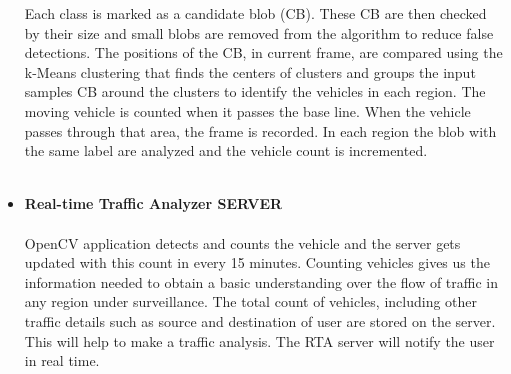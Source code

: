\begin{itemize}
Each class is marked as a candidate blob (CB). These CB are then checked by their size and small blobs are removed from the algorithm to reduce false detections. The positions of the CB, in current frame, are compared using the k-Means clustering that finds the centers of clusters and groups the input samples CB around the clusters to identify the vehicles in each region. The moving vehicle is counted when it passes the base line. When the vehicle passes through that area, the frame is recorded. In each region the blob with the same label are analyzed and the vehicle count is incremented.\\ \\
\item \textbf{Real-time Traffic Analyzer SERVER}\\ \\
OpenCV application detects and counts the vehicle and the server gets updated with this count in every 15 minutes. Counting vehicles gives us the information needed to obtain a basic understanding over the flow of traffic in any region under surveillance. The total count of vehicles, including other traffic details such as source and destination of user are stored on the server. This will help to make a traffic analysis. The RTA server will notify the user in real time.\\ \\

\end{itemize}
